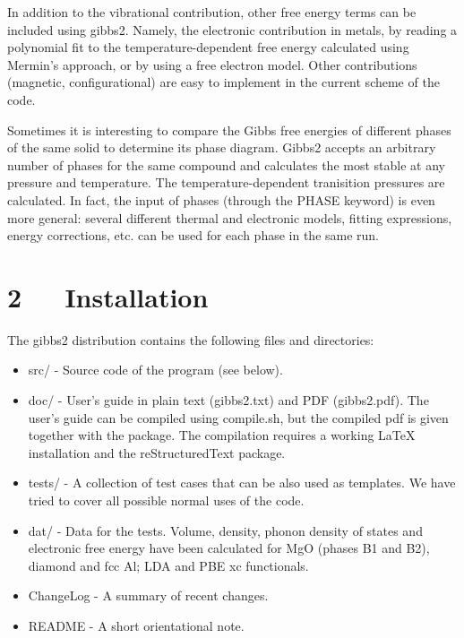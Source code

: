 \documentclass[a4paper]{article}
\begin{document}
In addition to the vibrational contribution, other free energy terms
can be included using gibbs2. Namely, the electronic contribution in
metals, by reading a polynomial fit to the temperature-dependent free
energy calculated using Mermin's approach, or by using a free electron
model. Other contributions (magnetic, configurational) are easy to
implement in the current scheme of the code.

Sometimes it is interesting to compare the Gibbs free energies of
different phases of the same solid to determine its phase
diagram. Gibbs2 accepts an arbitrary number of phases for the same
compound and calculates the most stable at any pressure and
temperature. The temperature-dependent tranisition pressures are
calculated. In fact, the input of phases (through the PHASE keyword)
is even more general: several different thermal and electronic models,
fitting expressions, energy corrections, etc. can be used for each
phase in the same run.


\section{2~~~Installation%
  \label{installation}%
}

The gibbs2 distribution contains the following files and directories:
%
\begin{itemize}

\item src/ - Source code of the program (see below).

\item doc/ - User's guide in plain text (gibbs2.txt) and PDF
(gibbs2.pdf). The user's guide can be compiled using compile.sh, but
the compiled pdf is given together with the package. The compilation
requires a working LaTeX installation and the reStructuredText
package.

\item tests/ - A collection of test cases that can be also used as
templates. We have tried to cover all possible normal uses of the
code.

\item dat/ - Data for the tests. Volume, density, phonon density of states
and electronic free energy have been calculated for MgO (phases B1
and B2), diamond and fcc Al; LDA and PBE xc functionals.

\item ChangeLog - A summary of recent changes.

\item README - A short orientational note.

\end{itemize}
\end{document}
